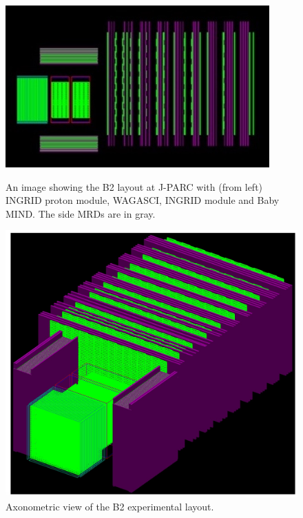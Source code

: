 \begin{figure}[h!]
  \centering
  \begin{minipage}[b]{0.59\textwidth}
    \includegraphics[width=\textwidth]{figures/B2Top.jpeg}
    \vspace{2mm}
    \caption{An image showing the B2 layout at J-PARC with (from left) INGRID proton module, WAGASCI, INGRID module and Baby MIND. The side MRDs are in gray.}
    \label{fig:B2environ}
  \end{minipage}
  \hfill
  \begin{minipage}[b]{0.39\textwidth}
    \includegraphics[width=\textwidth]{figures/B2SideUp.jpeg}
       \vspace{2mm}
    \caption{Axonometric view of the B2 experimental layout.}
     \label{fig:B2environ2}
  \end{minipage}
\end{figure}

